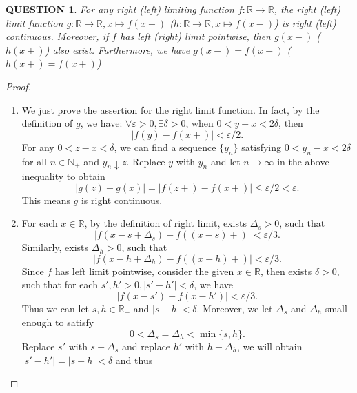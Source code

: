 \documentclass[12pt]{article}
\renewcommand{\(}{\left(}%
\renewcommand{\)}{\right)}%
\renewcommand{\[}{\left[}%
\renewcommand{\]}{\right]}%
\renewcommand{\r}{\mathbb{R}}
\newcommand{\n}{\mathbb{N}}
\newtheorem{question}{QUESTION}[section]}
\newtheorem{proof}{Proof.}}
\begin{document}
  \begin{question}
   For any right (left) limiting function $f:\r\to \r$, the right (left) limit function $g:\r\to \r,x\mapsto f(x+)$ ($h:\r\to \r,x\mapsto f(x-)$) is right (left) continuous. Moreover, if $f$ has left (right) limit pointwise, then $g(x-)$ ($h(x+)$) also exist. Furthermore, we have $g(x-)=f(x-)$ ($h(x+)=f(x+)$)
  \end{question}
  \begin{proof}
   \begin{enumerate}
    \item We just prove the assertion for the right limit function. In fact, by the definition of $g$, we have: $\forall\varepsilon>0,\exists\delta>0$, when $0<y-x<2\delta$, then
   \begin{equation*}
    |f(y)-f(x+)|<\varepsilon/2.
   \end{equation*}
   For any $0<z-x<\delta$, we can find a sequence $\{y_n\}$ satisfying $0<y_n-x<2\delta$ for all $n\in\n_+$ and $y_n\downarrow z$. Replace $y$ with $y_n$ and let $n\to\infty$ in the above inequality to obtain
   \begin{equation*}
    |g(z)-g(x)|=|f(z+)-f(x+)|\leq\varepsilon/2<\varepsilon.
   \end{equation*}
   This means $g$ is right continuous.
    \item For each $x\in\r$, by the definition of right limit, exists $\Delta_s>0$, such that
    \begin{equation*}
     |f(x-s+\Delta_s )-f((x-s)+)|<\varepsilon/3.
    \end{equation*}
    Similarly, exists $\Delta_h>0$, such that
    \begin{equation*}
     |f(x-h+\Delta_h )-f((x-h)+)|<\varepsilon/3.
    \end{equation*}
    Since $f$ has left limit pointwise, consider the given $x\in\r$, then exists $\delta>0$, such that for each $s',h'>0,|s'-h'|<\delta$, we have
    \begin{equation*}
     |f(x-s')-f(x-h')|<\varepsilon/3.
    \end{equation*}
    Thus we can let $s,h\in\r_+$ and $|s-h|<\delta$. Moreover, we let $\Delta_s$ and $\Delta_h$ small enough to satisfy
    \begin{equation*}
     0<\Delta_s=\Delta_h< \min\{s,h\}.
    \end{equation*}
    Replace $s'$ with $s-\Delta_s$ and replace $h'$ with $h-\Delta_h$, we will obtain $|s'-h'|=|s-h|<\delta$ and thus
    \begin{equation*}

\end{equation*}
\end{enumerate}
\end{proof}
\end{document}
